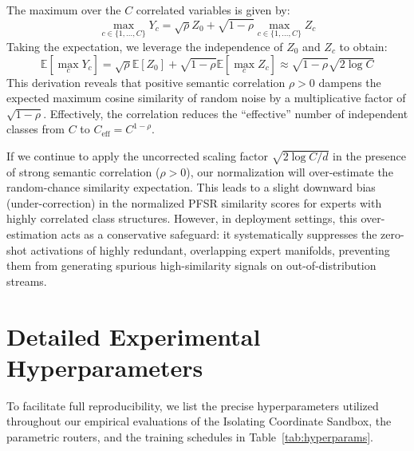 \documentclass{article}
\theoremstyle{plain}
\theoremstyle{definition}
\theoremstyle{remark}
\begin{document}
The maximum over the $C$ correlated variables is given by:
\begin{equation}
\max_{c \in \{1, \dots, C\}} Y_c = \sqrt{\rho} Z_0 + \sqrt{1 - \rho} \max_{c \in \{1, \dots, C\}} Z_c
\end{equation}
Taking the expectation, we leverage the independence of $Z_0$ and $Z_c$ to obtain:
\begin{equation}
\mathbb{E}[\max_{c} Y_c] = \sqrt{\rho} \mathbb{E}[Z_0] + \sqrt{1 - \rho} \mathbb{E}[\max_{c} Z_c] \approx \sqrt{1 - \rho} \sqrt{2 \log C}
\end{equation}
This derivation reveals that positive semantic correlation $\rho > 0$ dampens the expected maximum cosine similarity of random noise by a multiplicative factor of $\sqrt{1 - \rho}$. Effectively, the correlation reduces the ``effective'' number of independent classes from $C$ to $C_{\text{eff}} = C^{1-\rho}$.

If we continue to apply the uncorrected scaling factor $\sqrt{2\log C / d}$ in the presence of strong semantic correlation ($\rho > 0$), our normalization will over-estimate the random-chance similarity expectation. This leads to a slight downward bias (under-correction) in the normalized PFSR similarity scores for experts with highly correlated class structures. However, in deployment settings, this over-estimation acts as a conservative safeguard: it systematically suppresses the zero-shot activations of highly redundant, overlapping expert manifolds, preventing them from generating spurious high-similarity signals on out-of-distribution streams.

\section{Detailed Experimental Hyperparameters}
\label{app:hyperparams}

To facilitate full reproducibility, we list the precise hyperparameters utilized throughout our empirical evaluations of the Isolating Coordinate Sandbox, the parametric routers, and the training schedules in Table~\ref{tab:hyperparams}.
\end{document}

